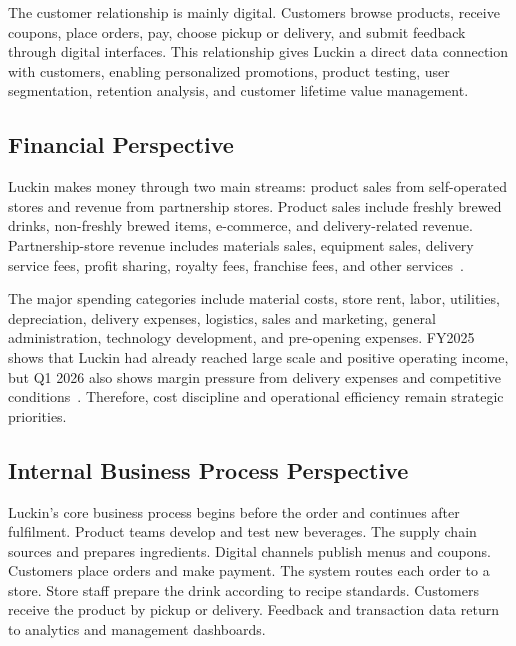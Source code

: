 \documentclass[12pt,a4paper]{article}
\begin{document}
The customer relationship is mainly digital. Customers browse products, receive coupons, place orders, pay, choose pickup or delivery, and submit feedback through digital interfaces. This relationship gives Luckin a direct data connection with customers, enabling personalized promotions, product testing, user segmentation, retention analysis, and customer lifetime value management.

\subsection{Financial Perspective}

Luckin makes money through two main streams: product sales from self-operated stores and revenue from partnership stores. Product sales include freshly brewed drinks, non-freshly brewed items, e-commerce, and delivery-related revenue. Partnership-store revenue includes materials sales, equipment sales, delivery service fees, profit sharing, royalty fees, franchise fees, and other services~\cite{luckin_fy2025_results,luckin_q1_2026}.

The major spending categories include material costs, store rent, labor, utilities, depreciation, delivery expenses, logistics, sales and marketing, general administration, technology development, and pre-opening expenses. FY2025 shows that Luckin had already reached large scale and positive operating income, but Q1 2026 also shows margin pressure from delivery expenses and competitive conditions~\cite{luckin_q1_2026}. Therefore, cost discipline and operational efficiency remain strategic priorities.

\subsection{Internal Business Process Perspective}

Luckin's core business process begins before the order and continues after fulfilment. Product teams develop and test new beverages. The supply chain sources and prepares ingredients. Digital channels publish menus and coupons. Customers place orders and make payment. The system routes each order to a store. Store staff prepare the drink according to recipe standards. Customers receive the product by pickup or delivery. Feedback and transaction data return to analytics and management dashboards.
\end{document}
